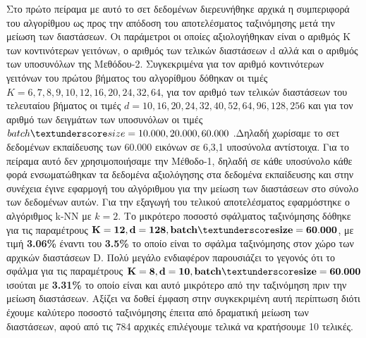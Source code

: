 \par
Στο πρώτο πείραμα με αυτό το σετ δεδομένων διερευνήθηκε αρχικά η συμπεριφορά του αλγορίθμου ως προς την απόδοση του αποτελέσματος ταξινόμησης μετά την μείωση των διαστάσεων. Οι παράμετροι οι οποίες αξιολογήθηκαν είναι ο αριθμός \textlatin{K} των κοντινότερων γειτόνων, ο αριθμός των τελικών διαστάσεων \textlatin{d} αλλά και ο αριθμός των υποσυνόλων της Μεθόδου-2. Συγκεκριμένα για τον αριθμό κοντινότερων γειτόνων του πρώτου βήματος του αλγορίθμου δόθηκαν οι τιμές $K = 6,7,8,9,10,12,16,20,24,32,64$, για τον αριθμό των τελικών διαστάσεων του τελευταίου βήματος οι τιμές $d = 10,16,20,24,32,40,52,64,96,128,256$ και για τον αριθμό των δειγμάτων των υποσυνόλων οι τιμές $batch\textunderscore size = 10.000,20.000,60.000$ .Δηλαδή χωρίσαμε το σετ δεδομένων εκπαίδευσης των 60.000 εικόνων σε 6,3,1 υποσύνολα αντίστοιχα. Για το πείραμα αυτό δεν χρησιμοποιήσαμε την Μέθοδο-1, δηλαδή σε κάθε υποσύνολο κάθε φορά ενσωματώθηκαν τα δεδομένα αξιολόγησης στα δεδομένα εκπαίδευσης και στην συνέχεια έγινε εφαρμογή του αλγόριθμου για την μείωση των διαστάσεων στο σύνολο των δεδομένων αυτών. Για την εξαγωγή του τελικού αποτελέσματος εφαρμόστηκε ο αλγόριθμος \textlatin{k-NN} με $k=2$. Το μικρότερο ποσοστό σφάλματος ταξινόμησης δόθηκε για τις παραμέτρους $\mathbf{K=12, d=128, batch\textunderscore size=60.000}$, με τιμή \textbf{3.06\%} έναντι του \textbf{3.5\%} το οποίο είναι το σφάλμα ταξινόμησης στον χώρο των αρχικών διαστάσεων \textlatin{D}. Πολύ μεγάλο ενδιαφέρον παρουσιάζει το γεγονός ότι το σφάλμα για τις παραμέτρους $\mathbf{K=8, d=10, batch\textunderscore size=60.000}$ ισούται με \textbf{3.31\%} το οποίο είναι και αυτό μικρότερο από την ταξινόμηση πριν την μείωση διαστάσεων. Αξίζει να δοθεί έμφαση στην συγκεκριμένη αυτή περίπτωση διότι έχουμε καλύτερο ποσοστό ταξινόμησης έπειτα από δραματική μείωση των διαστάσεων, αφού από τις 784 αρχικές επιλέγουμε τελικά να κρατήσουμε 10 τελικές. 
\par
